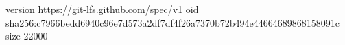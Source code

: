version https://git-lfs.github.com/spec/v1
oid sha256:c7966bedd6940c96e7d573a2df7df4f26a7370b72b494e44664689868158091c
size 22000
